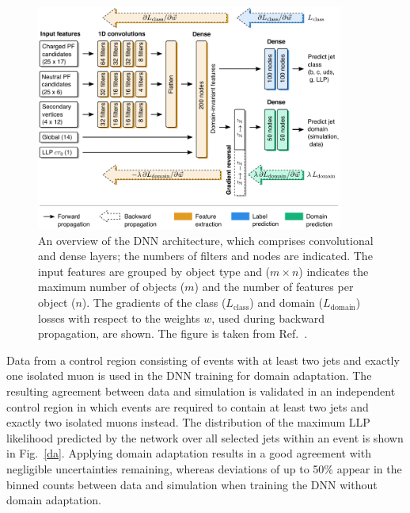 \documentclass{webofc}
\begin{document}
\begin{figure}[!ht]
\includegraphics[width=0.9\textwidth]{figs/network.pdf}
\centering
\caption{An overview of the DNN architecture, which comprises convolutional and dense layers; the numbers of filters and nodes are indicated. The input features are grouped by object type and ($m\times n$) indicates the maximum number of objects ($m$) and the number of features per object ($n$). The gradients of the class ($L_\textrm{class}$) and domain ($L_\textrm{domain}$) losses with respect to the weights $w$, used during backward propagation, are shown. The figure is taken from Ref.~\cite{CMS-EXO-19-011}.}
\label{arch}
\end{figure}

Data from a control region consisting of events with at least two jets and exactly one isolated muon is used in the DNN training for domain adaptation. The resulting agreement between data and simulation is validated in an independent control region in which events are required to contain at least two jets and exactly two isolated muons instead. The distribution of the maximum LLP likelihood predicted by the network over all selected jets within an event is shown in Fig.~\ref{da}. Applying domain adaptation results in a good agreement with negligible uncertainties remaining, whereas deviations of up to 50\% appear in the binned counts between data and simulation when training the DNN without domain adaptation.
\end{document}
